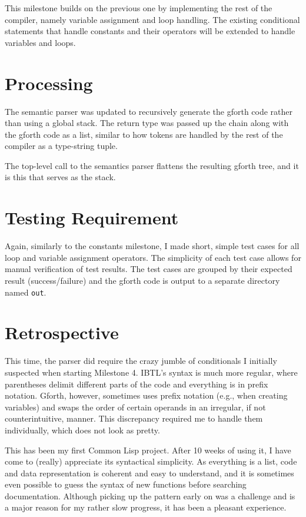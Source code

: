 \documentclass[12pt,letterpaper]{article}
\begin{document}
This milestone builds on the previous one by implementing the rest of the
compiler, namely variable assignment and loop handling. The existing
conditional statements that handle constants and their operators will be
extended to handle variables and loops.

\section*{Processing}

The semantic parser was updated to recursively generate the gforth code rather
than using a global stack. The return type was passed up the chain along with
the gforth code as a list, similar to how tokens are handled by the rest of the
compiler as a type-string tuple.

The top-level call to the semantics parser flattens the resulting gforth tree,
and it is this that serves as the stack.

\section*{Testing Requirement}

Again, similarly to the constants milestone, I made short, simple test cases
for all loop and variable assignment operators. The simplicity of each test
case allows for manual verification of test results. The test cases are grouped
by their expected result (success/failure) and the gforth code is output to
a separate directory named {\tt out}.

\section*{Retrospective}

This time, the parser did require the crazy jumble of conditionals I initially
suspected when starting Milestone 4. IBTL's syntax is much more regular, where
parentheses delimit different parts of the code and everything is in prefix
notation. Gforth, however, sometimes uses prefix notation (e.g., when creating
variables) and swaps the order of certain operands in an irregular, if not
counterintuitive, manner. This discrepancy required me to handle them
individually, which does not look as pretty.

This has been my first Common Lisp project. After 10 weeks of using it, I have
come to (really) appreciate its syntactical simplicity. As everything is
a list, code and data representation is coherent and easy to understand, and it
is sometimes even possible to guess the syntax of new functions before
searching documentation. Although picking up the pattern early on was
a challenge and is a major reason for my rather slow progress, it has been
a pleasant experience.
\end{document}
